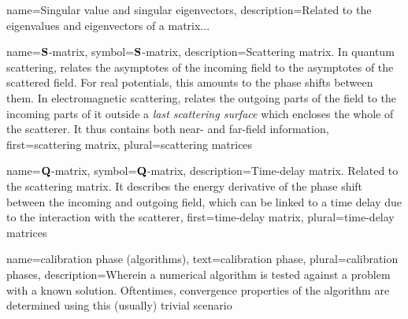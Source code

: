 
%
{%
  name={Singular value and singular eigenvectors},
  description={Related to the eigenvalues and eigenvectors of a matrix...}
}

%
{%
  name={$\mathbf{S}$-matrix},
  symbol={$\mathbf{S}$-matrix},
  description={Scattering matrix. In quantum scattering, relates the asymptotes of the
  				incoming field to the asymptotes of the scattered field. For real potentials,
  				this amounts to the phase shifts between them. In electromagnetic scattering,
  				relates the outgoing parts of the field to the incoming parts of it outside 
  				a \textit{last scattering surface} which encloses the whole of the scatterer.
  				It thus contains both near- and far-field information},
  first={scattering matrix},
  plural={scattering matrices}
}

%
{%
  name={$\mathbf{Q}$-matrix},
  symbol={$\mathbf{Q}$-matrix},
  description={Time-delay matrix. Related to the scattering matrix. 
  				It describes the energy derivative of the phase
  				shift between the incoming and outgoing field, which
  				can be linked to a time delay due to the interaction
  				with the scatterer},
  first={time-delay matrix},
  plural={time-delay matrices}
}

%
{%
  name={calibration phase (algorithms)},
  text={calibration phase},
  plural={calibration phases},
  description={Wherein a numerical algorithm is tested against a problem with a
		known solution. Oftentimes, convergence properties of the algorithm
		are determined using this (usually) trivial scenario}
}

